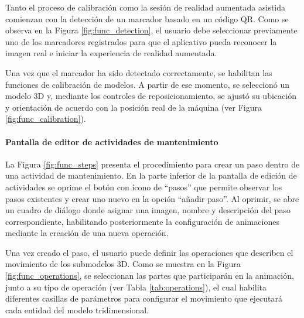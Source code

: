                 Tanto el proceso de calibración como la sesión de realidad aumentada asistida comienzan con la detección de un marcador basado en un código QR. Como se observa en la Figura \ref{fig:func_detection}, el usuario debe seleccionar previamente uno de los marcadores registrados para que el aplicativo pueda reconocer la imagen real e iniciar la experiencia de realidad aumentada.

                

                Una vez que el marcador ha sido detectado correctamente, se habilitan las funciones de calibración de modelos. A partir de ese momento, se seleccionó un modelo 3D y, mediante los controles de reposicionamiento, se ajustó su ubicación y orientación de acuerdo con la posición real de la máquina (ver Figura \ref{fig:func_calibration}).

                

            \paragraph{Pantalla de editor de actividades de mantenimiento}

                La Figura \ref{fig:func_steps} presenta el procedimiento para crear un paso dentro de una actividad de mantenimiento. En la parte inferior de la pantalla de edición de actividades se oprime el botón con ícono de “pasos” que permite observar los pasos existentes y crear uno nuevo en la opción “añadir paso”. Al oprimir, se abre un cuadro de diálogo donde asignar una imagen, nombre y descripción del paso correspondiente, habilitando posteriormente la configuración de animaciones mediante la creación de una nueva operación.

                

                Una vez creado el paso, el usuario puede definir las operaciones que describen el movimiento de los submodelos 3D. Como se muestra en la Figura \ref{fig:func_operations}, se seleccionan las partes que participarán en la animación, junto a su tipo de operación (ver Tabla \ref{tab:operations}), el cual habilita diferentes casillas de parámetros para configurar el movimiento que ejecutará cada entidad del modelo tridimensional.

                

